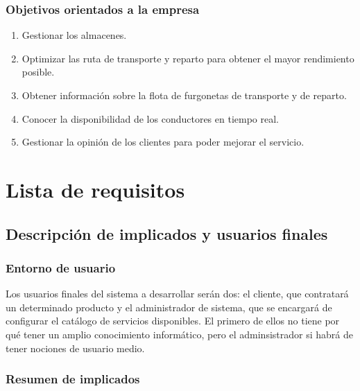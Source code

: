 \documentclass[12pt,spanish]{article}
\begin{document}
\subsubsection{Objetivos orientados a la empresa}
\begin{enumerate}[resume , label=\textbf{OBJ-\arabic*}]
	\item Gestionar los almacenes.
	\item Optimizar las ruta de transporte y reparto para obtener el mayor rendimiento posible. 
	\item Obtener información sobre la flota de furgonetas de transporte y de reparto.
	\item Conocer la disponibilidad de los conductores en tiempo real.
	\item Gestionar la opinión de los clientes para poder mejorar el servicio.
\end{enumerate}
\newpage
\section{Lista de requisitos}

\subsection{Descripción de implicados y usuarios finales}

\subsubsection{Entorno de usuario}
Los usuarios finales del sistema a desarrollar serán dos: el cliente, que contratará un determinado producto y el administrador de sistema, que se encargará de configurar el catálogo de servicios disponibles. El primero de ellos no tiene por qué tener un amplio conocimiento informático, pero el adminsistrador si habrá de tener nociones de usuario medio.
\subsubsection{Resumen de implicados}
\end{document}

